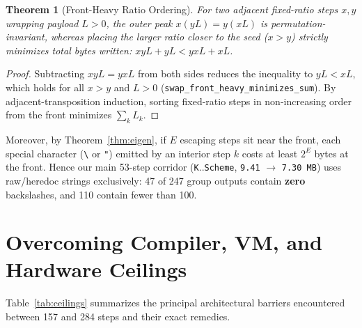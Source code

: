 \documentclass[10pt,twocolumn]{article}
\newtheorem{theorem}{Theorem}
\theoremstyle{definition}
\begin{document}
\begin{theorem}[Front-Heavy Ratio Ordering]
\label{thm:order}
For two adjacent fixed-ratio steps $x, y$ wrapping payload $L > 0$, the outer peak $x(yL) = y(xL)$ is permutation-invariant, whereas placing the larger ratio closer to the seed ($x > y$) strictly minimizes total bytes written: $xyL + yL < yxL + xL$.
\end{theorem}
\begin{proof}
Subtracting $xyL = yxL$ from both sides reduces the inequality to $yL < xL$, which holds for all $x > y$ and $L > 0$ (\texttt{swap\_front\_heavy\_minimizes\_sum}). By adjacent-transposition induction, sorting fixed-ratio steps in non-increasing order from the front minimizes $\sum_k L_k$.
\end{proof}

Moreover, by Theorem~\ref{thm:eigen}, if $E$ escaping steps sit near the front, each special character (\texttt{\textbackslash} or \texttt{"}) emitted by an interior step $k$ costs at least $2^E$ bytes at the front. Hence our main 53-step corridor (\texttt{K}..\texttt{Scheme}, \texttt{9.41} $\to$ \texttt{7.30 MB}) uses raw/heredoc strings exclusively: 47 of 247 group outputs contain \textbf{zero} backslashes, and 110 contain fewer than 100.

\section{Overcoming Compiler, VM, and Hardware Ceilings}
\label{sec:ceilings}

Table~\ref{tab:ceilings} summarizes the principal architectural barriers encountered between 157 and 284 steps and their exact remedies.
\end{document}
